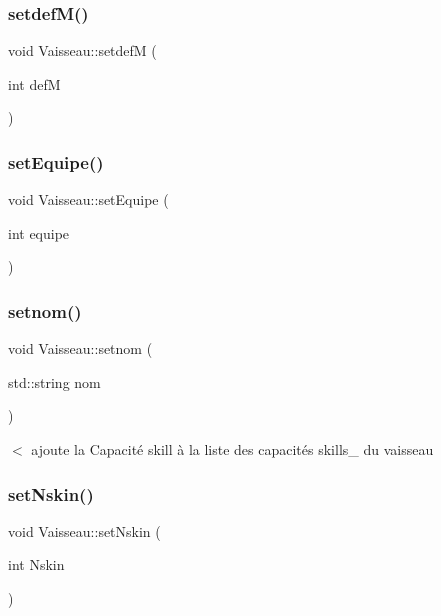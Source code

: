 \subsubsection{\texorpdfstring{setdef\+M()}{setdefM()}}
{\footnotesize\ttfamily void Vaisseau\+::setdefM (\begin{DoxyParamCaption}\item[{int}]{defM }\end{DoxyParamCaption})}

\mbox{\label{class_vaisseau_a1b3edda1f99d55cb5c0c7cbafe156af6}} 
\subsubsection{\texorpdfstring{set\+Equipe()}{setEquipe()}}
{\footnotesize\ttfamily void Vaisseau\+::set\+Equipe (\begin{DoxyParamCaption}\item[{int}]{equipe }\end{DoxyParamCaption})}

\mbox{\label{class_vaisseau_a46174e710a959996ac9ae56f11757e61}} 
\subsubsection{\texorpdfstring{setnom()}{setnom()}}
{\footnotesize\ttfamily void Vaisseau\+::setnom (\begin{DoxyParamCaption}\item[{std\+::string}]{nom }\end{DoxyParamCaption})}



$<$ ajoute la {\ttfamily Capacité} skill à la liste des capacités skills\+\_\+ du vaisseau 

\mbox{\label{class_vaisseau_a0d57458dc32dde2d8326c20f25172bab}} 
\subsubsection{\texorpdfstring{set\+Nskin()}{setNskin()}}
{\footnotesize\ttfamily void Vaisseau\+::set\+Nskin (\begin{DoxyParamCaption}\item[{int}]{Nskin }\end{DoxyParamCaption})}

